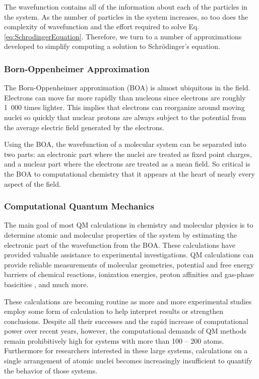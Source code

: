 The wavefunction contains all of the information about each of the particles in
the system. As the number of particles in the system increases, so too does the
complexity of wavefunction and the effort required to solve Eq.
\ref{eq:SchrodingerEquation}. Therefore, we turn to a number of approximations
developed to simplify computing a solution to Schr\"odinger's equation.

\subsubsection{Born-Oppenheimer Approximation}

The Born-Oppenheimer approximation (BOA) is almost ubiquitous in the field.
Electrons can move far more rapidly than nucleons since electrons are roughly
\mbox{1 000} times lighter. This implies that electrons can reorganize around
moving nuclei so quickly that nuclear protons are always subject to the
potential from the average electric field generated by the electrons.

Using the BOA, the wavefunction of a molecular system can be separated into two
parts: an electronic part where the nuclei are treated as fixed point charges,
and a nuclear part where the electrons are treated as a mean field.
\cite{McQuarrie_Book_PhysChem_1997} So critical is the BOA to computational
chemistry that it appears at the heart of nearly every aspect of the field.

\subsubsection{Computational Quantum Mechanics}
\label{sec:CompQuantumMech}

The main goal of most QM calculations in chemistry and molecular physics is to
determine atomic and molecular properties of the system by estimating the
electronic part of the wavefunction from the BOA. These calculations have
provided valuable assistance to experimental investigations. QM calculations
can provide reliable measurements of molecular geometries,
\cite{Jeletic_JOrganometChem_2011_v696_p3127} potential and free energy barriers
of chemical reactions, \cite{Chandrasekhar_JAmChemSoc_1985_v107_p154} ionization
energies, \cite{Watson_ChemPhysLett_2013_v555_p235} proton affinities and
gas-phase basicities \cite{Range_PhysChemChemPhys_2005_v7_p3070}, and much more.
\cite{Hehre_Ab_initio_MO_Theory_Book_1986}

These calculations are becoming routine as more and more experimental studies
employ some form of calculation to help interpret results or strengthen
conclusions. Despite all their successes and the rapid increase of computational
power over recent years, however, the computational demands of QM methods remain
prohibitively high for systems with more than 100 -- 200 atoms. Furthermore for
researchers interested in these large systems, calculations on a single
arrangement of atomic nuclei becomes increasingly insufficient to quantify the
behavior of those systems.


